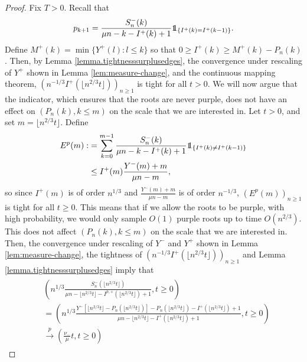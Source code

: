 \begin{proof}
Fix $T>0$. Recall that
$$p_{k+1}=\frac{S_n^{-}(k)}{\mu n - k -I^{+}(k)+1}\one_{\{I^{+}(k)=I^{+}(k-1)\}}.$$
Define $M^+(k)=\min\{Y^+(l):l\leq k\}$ so that $0\geq I^{+}(k)\geq M^+(k)-P_n(k)$.  Then, by Lemma \ref{lemma.tightnesssurplusedges}, the convergence under rescaling of $Y^+$ shown in Lemma \ref{lem:measure-change}, and the continuous mapping theorem, $\left(n^{-1/3}I^+(\lfloor n^{2/3} t \rfloor)\right)_{n\geq 1}$ is tight for all $t>0$.
We will now argue that the indicator, which ensures that the roots are never purple, does not have an effect on $(P_n(k),k\leq m)$ on the scale that we are interested in. Let $t>0$, and set $m=\lfloor n^{2/3}t\rfloor$. Define
\begin{align*}\begin{split}
E^p(m):&=\sum_{k=0}^{m-1}\frac{S_n^{-}(k)}{\mu n - k -I^{+}(k)+1}\one_{\{I^{+}(k)\neq I^{+}(k-1)\}}\\
&\leq I^{+}(m) \frac{Y^-(m)+m}{\mu n - m},\end{split}\end{align*}
so since $I^{+}(m)$ is of order $n^{1/3}$ and $\frac{Y^{-}(m)+m}{\mu n - m}$ is of order $n^{-1/3}$, $(E^p(m))_{n\geq 1}$ is tight for all $t\geq 0$.  This means that if we allow the roots to be purple, with high probability, we would only sample $O(1)$ purple roots up to time $O(n^{2/3})$. This does not affect $(P_n(k),k\leq m)$ on the scale that we are interested in. \\
 Then, the convergence under rescaling of $Y^-$ and $Y^+$ shown in Lemma \ref{lem:measure-change}, the tightness of $\left(n^{-1/3}I^{+}(\lfloor n^{2/3} t \rfloor)\right)_{n\geq 1}$ and Lemma \ref{lemma.tightnesssurplusedges} imply that
\begin{align}\begin{split}\label{eq.convergenceprob}
  &\left(n^{1/3}\frac{S_n^{-}\left(\lfloor n^{2/3} t \rfloor\right)}{\mu n - \lfloor n^{2/3} t \rfloor -I^{p,+}\left(\lfloor n^{2/3} t \rfloor\right)+1},t\geq 0\right)\\
 &=\left(n^{1/3}\frac{Y^-\left[\lfloor n^{2/3} t \rfloor-P_n\left(\lfloor n^{2/3} t \rfloor\right)\right]-P_n\left(\lfloor n^{2/3} t \rfloor\right)-I^{+}\left(\lfloor n^{2/3} t \rfloor\right)+1}{\mu n - \lfloor n^{2/3} t \rfloor -I^{+}\left(\lfloor n^{2/3} t \rfloor\right)+1},t\geq 0\right)\\
 &\overset{p}{\to} \left(\frac{\nu_-}{\mu}t,t\geq 0\right)\end{split}\end{align}

\end{proof}
